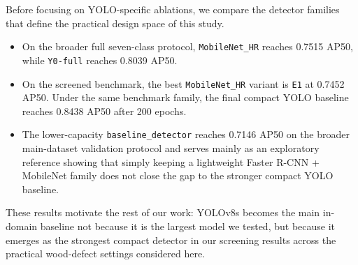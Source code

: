 Before focusing on YOLO-specific ablations, we compare the detector families that define the practical design space of this study.

\begin{itemize}[leftmargin=1.5em]
  \item On the broader full seven-class protocol, \texttt{MobileNet\_HR} reaches 0.7515 AP50, while \texttt{Y0-full} reaches 0.8039 AP50.
  \item On the screened benchmark, the best \texttt{MobileNet\_HR} variant is \texttt{E1} at 0.7452 AP50. Under the same benchmark family, the final compact YOLO baseline reaches 0.8438 AP50 after 200 epochs.
  \item The lower-capacity \texttt{baseline\_detector} reaches 0.7146 AP50 on the broader main-dataset validation protocol and serves mainly as an exploratory reference showing that simply keeping a lightweight Faster R-CNN + MobileNet family does not close the gap to the stronger compact YOLO baseline.
\end{itemize}

These results motivate the rest of our work: YOLOv8s becomes the main in-domain baseline not because it is the largest model we tested, but because it emerges as the strongest compact detector in our screening results across the practical wood-defect settings considered here.


